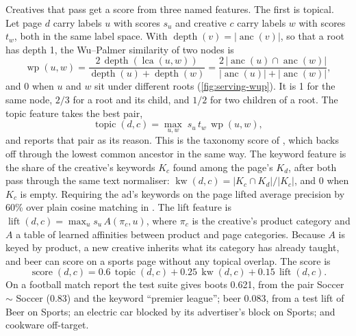 Creatives that pass get a score from three named features. The
first is topical. Let page $d$ carry labels $u$ with scores $s_u$ and creative
$c$ carry labels $w$ with scores $t_w$, both in the same \iab{} label space. With
$\operatorname{depth}(v) = |\operatorname{anc}(v)|$, so that a root has depth
1, the Wu--Palmer similarity of two nodes is
\begin{equation}\label{eq:serving-wup}
\operatorname{wp}(u, w) = \frac{2\,\operatorname{depth}(\operatorname{lca}(u, w))}{\operatorname{depth}(u) + \operatorname{depth}(w)}
 = \frac{2\,|\operatorname{anc}(u) \cap \operatorname{anc}(w)|}{|\operatorname{anc}(u)| + |\operatorname{anc}(w)|},
\end{equation}
and $0$ when $u$ and $w$ sit under different roots (\cref{fig:serving-wup}).
It is 1 for the same node, $2/3$ for a root and its child, and $1/2$ for two
children of a root. The topic feature takes the best pair,
\begin{equation}\label{eq:serving-topic}
\operatorname{topic}(d, c) = \max_{u, w}\; s_u\, t_w\, \operatorname{wp}(u, w),
\end{equation}
and reports that pair as its reason. This is the taxonomy score of
\citet{broder2007semantic}, which backs off through the lowest common ancestor
in the same way. The keyword feature is the share of the creative's keywords
$K_c$ found among the page's $K_d$, after both pass through the same text
normaliser: $\operatorname{kw}(d, c) = |K_c \cap K_d| / |K_c|$, and $0$ when
$K_c$ is empty. Requiring the ad's keywords on the page lifted average
precision by 60\% over plain cosine matching in \citet{ribeironeto2005impedance}. The lift feature
is $\operatorname{lift}(d, c) = \max_u s_u\, A(\pi_c, u)$, where $\pi_c$ is the
creative's product category and $A$ a table of learned affinities between
product and page categories. Because $A$ is keyed by product, a new creative
inherits what its category has already taught, and beer can score on a sports
page without any topical overlap. The score is
\begin{equation}\label{eq:serving-score}
\operatorname{score}(d, c) = 0.6\,\operatorname{topic}(d, c) + 0.25\,\operatorname{kw}(d, c) + 0.15\,\operatorname{lift}(d, c).
\end{equation}
On a football match report the test suite gives boots 0.621, from the pair
Soccer $\sim$ Soccer (0.83) and the keyword ``premier league''; beer 0.083,
from a test lift of Beer on Sports; an electric car blocked by its
advertiser's block on Sports; and cookware off-target.


